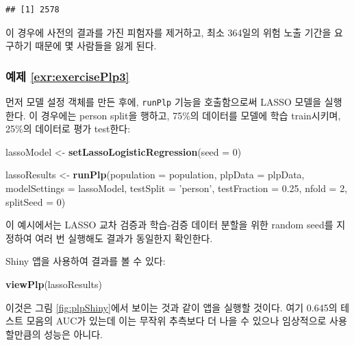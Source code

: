 \documentclass[10.5pt]{book}
\newenvironment{Shaded}{\begin{snugshade}}{\end{snugshade}}
\newcommand{\KeywordTok}[1]{\textcolor[rgb]{0.13,0.29,0.53}{\textbf{#1}}}
\newcommand{\DataTypeTok}[1]{\textcolor[rgb]{0.13,0.29,0.53}{#1}}
\newcommand{\DecValTok}[1]{\textcolor[rgb]{0.00,0.00,0.81}{#1}}
\newcommand{\FloatTok}[1]{\textcolor[rgb]{0.00,0.00,0.81}{#1}}
\newcommand{\StringTok}[1]{\textcolor[rgb]{0.31,0.60,0.02}{#1}}
\newcommand{\NormalTok}[1]{#1}
\theoremstyle{definition}
\theoremstyle{definition}
\theoremstyle{definition}
\theoremstyle{remark}
\begin{document}
\begin{verbatim}
## [1] 2578
\end{verbatim}

이 경우에 사전의 결과를 가진 피험자를 제거하고, 최소 364일의 위험 노출
기간을 요구하기 때문에 몇 사람들을 잃게 된다.

\subsubsection*{예제 \ref{exr:exercisePlp3}}\label{-refexrexerciseplp3}

먼저 모델 설정 객체를 만든 후에, \texttt{runPlp} 기능을 호출함으로써
LASSO 모델을 실행한다. 이 경우에는 person split을 행하고, 75\%의
데이터를 모델에 학습 train시키며, 25\%의 데이터로 평가 test한다:

\begin{Shaded}
\begin{Highlighting}[]
\NormalTok{lassoModel <-}\StringTok{ }\KeywordTok{setLassoLogisticRegression}\NormalTok{(}\DataTypeTok{seed =} \DecValTok{0}\NormalTok{)}

\NormalTok{lassoResults <-}\StringTok{ }\KeywordTok{runPlp}\NormalTok{(}\DataTypeTok{population =}\NormalTok{ population,}
                       \DataTypeTok{plpData =}\NormalTok{ plpData,}
                       \DataTypeTok{modelSettings =}\NormalTok{ lassoModel,}
                       \DataTypeTok{testSplit =} \StringTok{'person'}\NormalTok{,}
                       \DataTypeTok{testFraction =} \FloatTok{0.25}\NormalTok{,}
                       \DataTypeTok{nfold =} \DecValTok{2}\NormalTok{,}
                       \DataTypeTok{splitSeed =} \DecValTok{0}\NormalTok{)}
\end{Highlighting}
\end{Shaded}

이 예시에서는 LASSO 교차 검증과 학습-검증 데이터 분할을 위한 random
seed를 지정하여 여러 번 실행해도 결과가 동일한지 확인한다.

Shiny 앱을 사용하여 결과를 볼 수 있다:

\begin{Shaded}
\begin{Highlighting}[]
\KeywordTok{viewPlp}\NormalTok{(lassoResults)}
\end{Highlighting}
\end{Shaded}

이것은 그림 \ref{fig:plpShiny}에서 보이는 것과 같이 앱을 실행할 것이다.
여기 0.645의 테스트 모음의 AUC가 있는데 이는 무작위 추측보다 더 나을 수
있으나 임상적으로 사용할만큼의 성능은 아니다.
\end{document}
